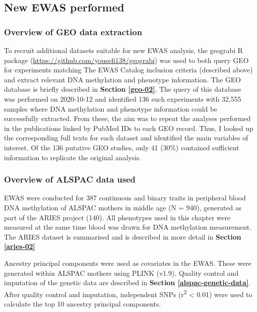 \documentclass[11pt,twoside]{bristolthesis}
\begin{document}
\hypertarget{new-ewas-03}{%
\subsection{New EWAS performed}\label{new-ewas-03}}

\hypertarget{geo-data-extraction}{%
\subsubsection{Overview of GEO data extraction}\label{geo-data-extraction}}

To recruit additional datasets suitable for new EWAS analysis, the geograbi R package (\url{https://github.com/yousefi138/geograbi}) was used to both query GEO for experiments matching The EWAS Catalog inclusion criteria (described above) and extract relevant DNA methylation and phenotype information. The GEO database is briefly described in \textbf{Section \ref{geo-02}}. The query of this database was performed on 2020-10-12 and identified 136 such experiments with 32,555 samples where DNA methylation and phenotype information could be successfully extracted. From these, the aim was to repeat the analyses performed in the publications linked by PubMed IDs to each GEO record. Thus, I looked up the corresponding full texts for each dataset and identified the main variables of interest. Of the 136 putative GEO studies, only 41 (30\%) contained sufficient information to replicate the original analysis.

\hypertarget{alspac-03}{%
\subsubsection{Overview of ALSPAC data used}\label{alspac-03}}

EWAS were conducted for 387 continuous and binary traits in peripheral blood DNA methylation of ALSPAC mothers in middle age (N = 940), generated as part of the ARIES project (140). All phenotypes used in this chapter were measured at the same time blood was drawn for DNA methylation measurement. The ARIES dataset is summarised and is described in more detail in \textbf{Section \ref{aries-02}}

Ancestry principal components were used as covariates in the EWAS. These were generated within ALSPAC mothers using PLINK (v1.9). Quality control and imputation of the genetic data are described in \textbf{Section \ref{alspac-genetic-data}}. After quality control and imputation, independent SNPs (r\textsuperscript{2} \textless{} 0.01) were used to calculate the top 10 ancestry principal components.
\end{document}
